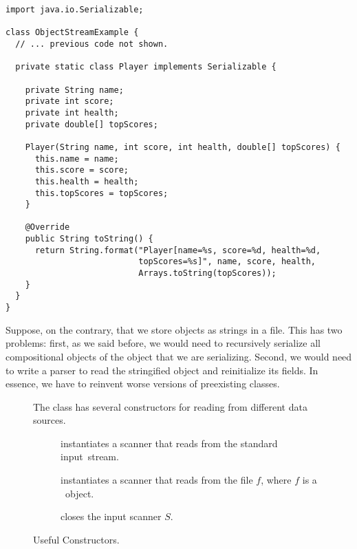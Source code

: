 \begin{lstlisting}[language=MyJava]
import java.io.Serializable;

class ObjectStreamExample {
  // ... previous code not shown.

  private static class Player implements Serializable {

    private String name;
    private int score;
    private int health;
    private double[] topScores;
    
    Player(String name, int score, int health, double[] topScores) {
      this.name = name;
      this.score = score;
      this.health = health;
      this.topScores = topScores;
    }
    
    @Override
    public String toString() {
      return String.format("Player[name=%s, score=%d, health=%d, 
                           topScores=%s]", name, score, health, 
                           Arrays.toString(topScores));
    }
  }
}
\end{lstlisting}

Suppose, on the contrary, that we store objects as strings in a file. This has two problems: first, as we said before, we would need to recursively serialize all compositional objects of the object that we are serializing. Second, we would need to write a parser to read the stringified object and reinitialize its fields. In essence, we have to reinvent worse versions of preexisting classes.

\begin{figure}[tp]
  \small
  \begin{tcolorbox}[title=Scanner Constructor Methods]
    The  class has several constructors for reading from different data sources.
    \vspace{2ex}
  \begin{description}
    \item [] instantiates a scanner that reads from the standard input~stream.
    \item [] instantiates a scanner that reads from the file $f$, where $f$ is a ~object.
    \item [] closes the input scanner $S$.
  \end{description}
\end{tcolorbox}
\caption{Useful  Constructors.}
\label{fig:sccons}
\end{figure}


